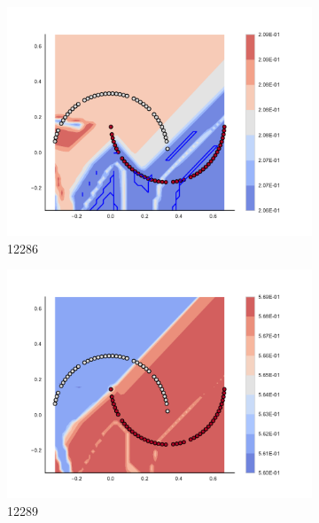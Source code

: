 \begin{figure}[h]
\begin{subfigure}[b]{0.09\textwidth}
    \includegraphics[clip, trim=2.35cm 1.75cm 4.5cm 0cm,width=\textwidth]{img/convergence/12286.pdf}
    \caption{12286}
    \label{fig:convergence_12286}
\end{subfigure}
%
\begin{subfigure}[b]{0.09\textwidth}
    \includegraphics[clip, trim=2.35cm 1.75cm 4.5cm 0cm,width=\textwidth]{img/convergence/12289.pdf}
    \caption{12289}
    \label{fig:convergence_12289}
\end{subfigure}
%
\begin{subfigure}[b]{0.09\textwidth}

\end{subfigure}
\end{figure}
